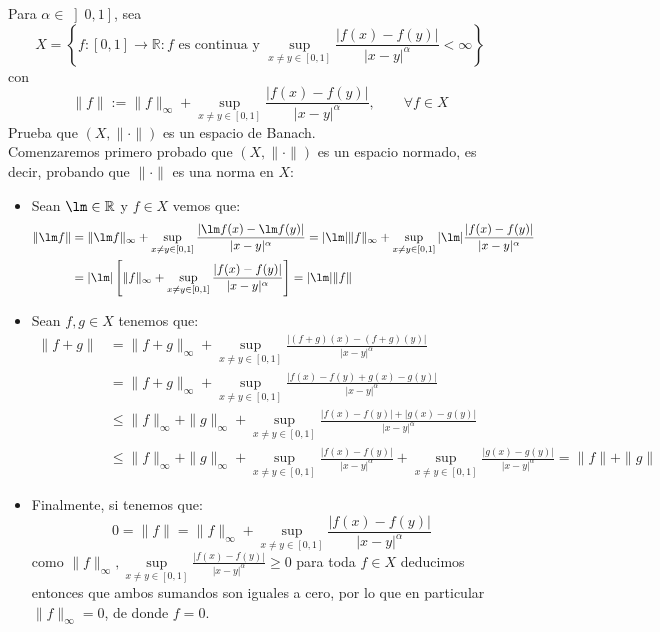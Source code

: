 \documentclass[12pt]{article}
\begin{document}
    \begin{ejercicio}
        Para $\alpha\in \left]0,1\right]$, sea
        \begin{equation*}
            X = \left\{f:[0,1]\to \mathbb{R} : f\text{\ es continua y\ } \sup_{x\neq y \in [0,1]}\frac{|f(x)-f(y)|}{|x-y|^{\alpha}}<\infty\right\}
        \end{equation*}
        con
        \begin{equation*}
        \|f\| := \|f\|_\infty + \sup_{x\neq y \in [0,1]}\frac{|f(x)-f(y)|}{|x-y|^{\alpha}}, \qquad \forall f\in X
        \end{equation*}
        Prueba que $(X,\|\cdot \|)$ es un espacio de Banach.\\

        \noindent
        Comenzaremos primero probado que $(X,\|\cdot \|)$ es un espacio normado, es decir, probando que $\|\cdot \|$ es una norma en $X$:
        \begin{itemize}
            \item Sean $\lm\in \mathbb{R}$ y $f\in X$ vemos que:
                \begin{align*}
                    \|\lm f\| &= \|\lm f\|_\infty + \sup_{x\neq y \in [0,1]}\frac{|\lm f(x)-\lm f(y)|}{|x-y|^{\alpha}} = |\lm|\|f\|_\infty + \sup_{x\neq y \in [0,1]}|\lm|\frac{| f(x)- f(y)|}{|x-y|^{\alpha}}  \\
                              &= |\lm|\left[\|f\|_\infty + \sup_{x\neq y \in [0,1]}\frac{|f(x)-f(y)|}{|x-y|^{\alpha}} \right] = |\lm|\|f\|
                \end{align*}
            \item Sean $f,g\in X$ tenemos que:
                \begin{align*}
                    \|f+g\| &= \|f+g\|_\infty + \sup_{x\neq y \in [0,1]}\frac{|(f+g)(x)-(f+g)(y)|}{|x-y|^{\alpha}}  \\ &= \|f+g\|_\infty + \sup_{x\neq y \in [0,1]}\frac{|f(x)-f(y)+g(x)-g(y)|}{|x-y|^{\alpha}}  \\ 
                            &\leq \|f\|_\infty + \|g\|_\infty + \sup_{x\neq y \in [0,1]}\frac{|f(x)-f(y)|+|g(x)-g(y)|}{|x-y|^{\alpha}}   \\
                            &\leq \|f\|_\infty + \|g\|_\infty + \sup_{x\neq y \in [0,1]}\frac{| f(x)- f(y)|}{|x-y|^{\alpha}}  + \sup_{x\neq y \in [0,1]}\frac{| g(x)- g(y)|}{|x-y|^{\alpha}} = \|f\| + \|g\|
                \end{align*}
            \item Finalmente, si tenemos que:
                \begin{equation*}
                    0 = \|f\| = \|f\|_\infty + \sup_{x\neq y \in [0,1]}\frac{| f(x)- f(y)|}{|x-y|^{\alpha}}
                \end{equation*}
                como $\|f\|_\infty, \sup\limits_{x\neq y \in [0,1]}\frac{| f(x)- f(y)|}{|x-y|^{\alpha}}\geq 0$ para toda $f\in X$ deducimos entonces que ambos sumandos son iguales a cero, por lo que en particular $\|f\|_\infty = 0$, de donde $f=0$.
        \end{itemize}


\end{ejercicio}
\end{document}
